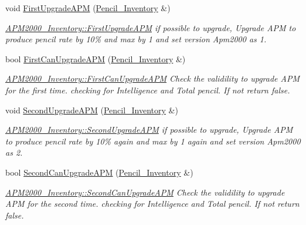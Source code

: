 \begin{DoxyCompactItemize}
void \mbox{\hyperlink{classAPM2000__Inventory_a5e40a4bddfb46321d256787f678808f7}{First\+Upgrade\+A\+PM}} (\mbox{\hyperlink{classPencil__Inventory}{Pencil\+\_\+\+Inventory}} \&)
\begin{DoxyCompactList}\small\item\em \mbox{\hyperlink{classAPM2000__Inventory_a5e40a4bddfb46321d256787f678808f7}{A\+P\+M2000\+\_\+\+Inventory\+::\+First\+Upgrade\+A\+PM}} if possible to upgrade, Upgrade A\+PM to produce pencil rate by 10\% and max by 1 and set version Apm2000 as 1. \end{DoxyCompactList}\item 
bool \mbox{\hyperlink{classAPM2000__Inventory_a33bd841a262cb1b7901c7dfaf851da7c}{First\+Can\+Upgrade\+A\+PM}} (\mbox{\hyperlink{classPencil__Inventory}{Pencil\+\_\+\+Inventory}} \&)
\begin{DoxyCompactList}\small\item\em \mbox{\hyperlink{classAPM2000__Inventory_a33bd841a262cb1b7901c7dfaf851da7c}{A\+P\+M2000\+\_\+\+Inventory\+::\+First\+Can\+Upgrade\+A\+PM}} Check the validility to upgrade A\+PM for the first time. checking for Intelligence and Total pencil. If not return false. \end{DoxyCompactList}\item 
void \mbox{\hyperlink{classAPM2000__Inventory_af6637ca987470d8603bba595b31d7cc0}{Second\+Upgrade\+A\+PM}} (\mbox{\hyperlink{classPencil__Inventory}{Pencil\+\_\+\+Inventory}} \&)
\begin{DoxyCompactList}\small\item\em \mbox{\hyperlink{classAPM2000__Inventory_af6637ca987470d8603bba595b31d7cc0}{A\+P\+M2000\+\_\+\+Inventory\+::\+Second\+Upgrade\+A\+PM}} if possible to upgrade, Upgrade A\+PM to produce pencil rate by 10\% again and max by 1 again and set version Apm2000 as 2. \end{DoxyCompactList}\item 
bool \mbox{\hyperlink{classAPM2000__Inventory_a752f84068143b5f79f4e25b846b25a6c}{Second\+Can\+Upgrade\+A\+PM}} (\mbox{\hyperlink{classPencil__Inventory}{Pencil\+\_\+\+Inventory}} \&)
\begin{DoxyCompactList}\small\item\em \mbox{\hyperlink{classAPM2000__Inventory_a752f84068143b5f79f4e25b846b25a6c}{A\+P\+M2000\+\_\+\+Inventory\+::\+Second\+Can\+Upgrade\+A\+PM}} Check the validility to upgrade A\+PM for the second time. checking for Intelligence and Total pencil. If not return false. \end{DoxyCompactList}\end{DoxyCompactItemize}

